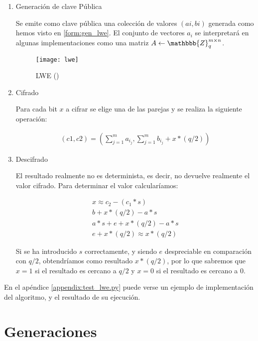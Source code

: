 \begin{enumerate}
  \item Generación de clave Pública

  Se emite como clave pública una colección de valores $(ai, bi)$ generada como hemos visto en \ref{form:gen_lwe}. El conjunto de vectores $a_i$ se interpretará en algunas implementaciones como una matriz $A \leftarrow \mathbbb{Z}_q^{m \times n}$.

    \begin{figure}[h]
      \caption{LWE (\cite{halevi_homomorphic_2017})}
      \label{fig:lwe}
      \texttt{[image: lwe]}
    \end{figure}

  \item Cifrado

  Para cada bit $x$ a cifrar se elige una de las parejas y se realiza la siguiente operación:

    \begin{gather*}
        \label{form:cifrado_lwe}
        (c1, c2) = (\sum_{j=1}^{m} a_i_j, \sum_{j=1}^{m} b_i_j + x * (q/2))
    \end{gather*}

  \item Descifrado

  El resultado realmente no es determinista, es decir, no devuelve realmente el valor cifrado. Para determinar el valor calcularíamos:

    \begin{gather*}
        \label{form:descifrado_lwe}
        x \approx c_2 - (c_1*s) \\
        b + x*(q/2) - a*s \\
        a*s + e + x*(q/2) - a*s \\
        e + x*(q/2) \approx x * (q/2)
    \end{gather*}

  Si se ha introducido $s$ correctamente, y siendo $e$ despreciable en comparación con $ q/2 $, obtendríamos como resultado $ x * (q/2) $, por lo que sabremos que $ x = 1$ si el resultado es cercano a $ q/2 $ y  $ x = 0 $ si el resultado es cercano a $ 0 $.

\end{enumerate}

En el apéndice \ref{appendix:test_lwe.py} puede verse un ejemplo de implementación del algoritmo, y el resultado de su ejecución.

\section{Generaciones}

